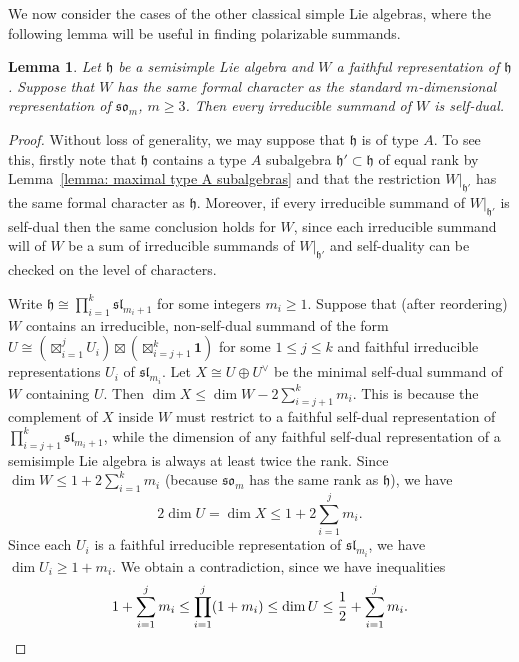 \documentclass{amsart}
\newtheorem{lemma}[theorem]{Lemma}
\theoremstyle{definition}
\numberwithin{equation}{section} %
\newcommand{\sllie}{\mathfrak{sl}}
\newcommand{\solie}{\mathfrak{so}}
\newcommand{\mf}[1]{\mathfrak{#1}}
\begin{document}
We now consider the cases of the other classical simple Lie algebras, where the following lemma will be useful in finding polarizable summands.

\begin{lemma} \label{lemma: so_q possible formal characters}
Let $\mathfrak{h}$ be a semisimple Lie algebra and $W$ a faithful representation of $\mf{h}$.
Suppose that $W$ has the same formal character as the standard $m$-dimensional representation of $\solie_{m}$, $m \geq 3$.
Then every irreducible summand of $W$ is self-dual.
\end{lemma}
\begin{proof}
Without loss of generality, we may suppose that $\mf{h}$ is of type $A$.
To see this, firstly note that $\mf{h}$ contains a type $A$ subalgebra $\mf{h}' \subset \mf{h}$ of equal rank by Lemma~\ref{lemma: maximal type A subalgebras} and that the restriction $W|_{\mf{h}'}$ has the same formal character as $\mf{h}$.
Moreover, if every irreducible summand of $W|_{\mf{h}'}$ is self-dual then the same conclusion holds for $W$, since each irreducible summand will of $W$ be a sum of irreducible summands of $W|_{\mf{h}'}$ and self-duality can be checked on the level of characters.

Write $\mf{h} \cong \prod_{i=1}^k \sllie_{m_i+1}$ for some integers $m_i \geq 1$.
Suppose that (after reordering) $W$ contains an irreducible, non-self-dual summand of the form $U \cong (\boxtimes_{i=1}^j U_i) \boxtimes (\boxtimes_{i=j+1}^k \mathbf{1})$ for some $1 \leq j \leq k$ and faithful irreducible representations $U_i$ of $\sllie_{m_i}$.
Let $X \cong U \oplus U^\vee$ be the minimal self-dual summand of $W$ containing $U$.
Then $\dim X \leq \dim W - 2 \sum_{i=j+1}^k m_i$.
This is because the complement of $X$ inside $W$ must restrict to a faithful self-dual representation of $\prod_{i=j+1}^k \sllie_{m_i+1}$, while the dimension of any faithful self-dual representation of a semisimple Lie algebra is always at least twice the rank.
Since $\dim W \leq 1 + 2\sum_{i=1}^k m_i$ (because $\solie_m$ has the same rank as $\mf{h}$), we have
\[
2 \dim U = \dim X \leq 1 + 2\sum_{i=1}^j m_i.
\]
Since each $U_i$ is a faithful irreducible representation of $\sllie_{m_i}$, we have $\dim U_i \geq 1+m_i$.
We obtain a contradiction, since we have inequalities
\[
1+ \sum_{i=1}^j m_i \leq \prod_{i=1}^j (1+m_i) \leq \dim U \leq \frac{1}{2} + \sum_{i=1}^j m_i. \qedhere
\] 
\end{proof}
\end{document}
